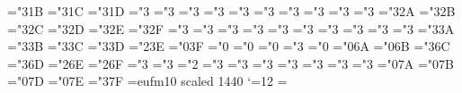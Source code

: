 \mathchardef\gnapprox="3\msb@1B \mathchardef\nsim="3\msb@1C
\mathchardef\ncong="3\msb@1D
\def\napprox{\not\approx}
\mathchardef\varsubsetneq="3
\mathchardef\varsupsetneq="3
\mathchardef\nsubseteqq="3
\mathchardef\nsupseteqq="3
\mathchardef\subsetneqq="3
\mathchardef\supsetneqq="3
\mathchardef\varsubsetneqq="3
\mathchardef\varsupsetneqq="3
\mathchardef\subsetneq="3 \mathchardef\supsetneq="3
\mathchardef\nsubseteq="3\msb@2A \mathchardef\nsupseteq="3\msb@2B
\mathchardef\nparallel="3\msb@2C \mathchardef\nmid="3\msb@2D
\mathchardef\nshortmid="3\msb@2E
\mathchardef\nshortparallel="3\msb@2F
\mathchardef\nvdash="3 \mathchardef\nVdash="3
\mathchardef\nvDash="3 \mathchardef\nVDash="3
\mathchardef\ntrianglerighteq="3
\mathchardef\ntrianglelefteq="3
\mathchardef\ntriangleleft="3
\mathchardef\ntriangleright="3
\mathchardef\nleftarrow="3
\mathchardef\nrightarrow="3
\mathchardef\nLeftarrow="3\msb@3A
\mathchardef\nRightarrow="3\msb@3B
\mathchardef\nLeftrightarrow="3\msb@3C
\mathchardef\nleftrightarrow="3\msb@3D
\mathchardef\divideontimes="2\msb@3E
\mathchardef\varnothing="0\msb@3F \mathchardef\nexists="0
\mathchardef\mho="0 \mathchardef\eth="0
\mathchardef\eqsim="3 \mathchardef\beth="0
\mathchardef\gimel="0\msb@6A \mathchardef\daleth="0\msb@6B
\mathchardef\lessdot="3\msb@6C \mathchardef\gtrdot="3\msb@6D
\mathchardef\ltimes="2\msb@6E \mathchardef\rtimes="2\msb@6F
\mathchardef\shortmid="3
\mathchardef\shortparallel="3
\mathchardef\smallsetminus="2
\mathchardef\thicksim="3 \mathchardef\thickapprox="3
\mathchardef\approxeq="3 \mathchardef\succapprox="3
\mathchardef\precapprox="3
\mathchardef\curvearrowleft="3
\mathchardef\curvearrowright="3
\mathchardef\digamma="0\msb@7A \mathchardef\varkappa="0\msb@7B
\mathchardef\hslash="0\msb@7D \mathchardef\hbar="0\msb@7E
\mathchardef\backepsilon="3\msb@7F
\def\Bbb{\ifmmode\let\next\Bbb@\else
 \def\next{\errmessage{Use \string\Bbb\space only in math mode}}\fi\next}
\def\Bbb@#1{{\Bbb@@{#1}}}
\def\Bbb@@#1{\fam\msbfam#1}
\font\sacfont=eufm10 scaled 1440 \catcode`\@=12
\def\sla#1{\mkern-1.5mu\raise0.4pt\hbox{$\not$}\mkern1.2mu #1\mkern 0.7mu}
\def\Dbar{\mkern-1.5mu\raise0.4pt\hbox{$\not$}\mkern-.1mu {\rm D}\mkern.1mu}
\def\Abar{\mkern1.mu\raise0.4pt\hbox{$\not$}\mkern-1.3mu A\mkern.1mu}
\nopagenumbers
\headline={\ifnum{}\hfill\else\draftdate\hfil{\headrm\folio}%
\hfil\hphantom{\draftdate}\fi} \else{} \hoffset=8mm \voffset=16mm
\def\hskipb#1#2{\hskip#1#2}
\def\sla#1{\mkern-1.5mu\raise0.5pt\hbox{$\not$}\mkern1.2mu #1\mkern 0.7mu}
\def\Dbar{\mkern-1.5mu\raise0.5pt\hbox{$\not$}\mkern-.1mu {\rm D}\mkern.1mu}
\def\Abar{\mkern1.mu\raise0.5pt\hbox{$\not$}\mkern-1.3mu A\mkern.1mu}
\fi

